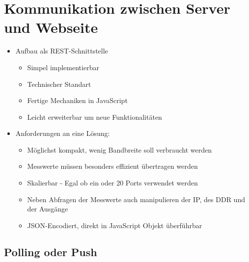\chapter{Kommunikation zwischen Server und Webseite}

\begin{itemize}
	\item Aufbau als REST-Schnittstelle
	\begin{itemize}
		\item Simpel implementierbar
		\item Technischer Standart
		\item Fertige Mechaniken in JavaScript
		\item Leicht erweiterbar um neue Funktionalitäten
	\end{itemize}
	\item Anforderungen an eine Lösung:
	\begin{itemize}
		\item Möglichst kompakt, wenig Bandbreite soll verbraucht werden
		\item Messwerte müssen besonders effizient übertragen werden
		\item Skalierbar - Egal ob ein oder 20 Ports verwendet werden
		\item Neben Abfragen der Messwerte auch manipulieren der IP, des DDR und der 
			  Ausgänge
		\item JSON-Encodiert, direkt in JavaScript Objekt überführbar
	\end{itemize}
\end{itemize}

\section*{Polling oder Push}

